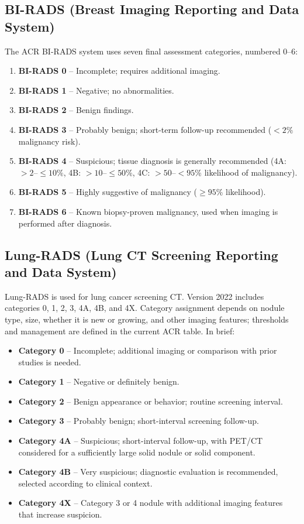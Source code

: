 \subsection{BI-RADS (Breast Imaging Reporting and Data System)}
The ACR BI-RADS system uses seven final assessment categories, numbered 0--6:
\begin{enumerate}
    \item \textbf{BI-RADS 0} -- Incomplete; requires additional imaging.
    \item \textbf{BI-RADS 1} -- Negative; no abnormalities.
    \item \textbf{BI-RADS 2} -- Benign findings.
    \item \textbf{BI-RADS 3} -- Probably benign; short-term follow-up recommended ($<2\%$ malignancy risk).
    \item \textbf{BI-RADS 4} -- Suspicious; tissue diagnosis is generally recommended (4A: $>2$--$\leq10\%$, 4B: $>10$--$\leq50\%$, 4C: $>50$--$<95\%$ likelihood of malignancy).
    \item \textbf{BI-RADS 5} -- Highly suggestive of malignancy ($\geq95\%$ likelihood).
    \item \textbf{BI-RADS 6} -- Known biopsy-proven malignancy, used when imaging is performed after diagnosis.
\end{enumerate}

\subsection{Lung-RADS (Lung CT Screening Reporting and Data System)}
Lung-RADS is used for lung cancer screening CT. Version 2022 includes categories 0, 1, 2, 3, 4A, 4B, and 4X. Category assignment depends on nodule type, size, whether it is new or growing, and other imaging features; thresholds and management are defined in the current ACR table. In brief:
\begin{itemize}
    \item \textbf{Category 0} -- Incomplete; additional imaging or comparison with prior studies is needed.
    \item \textbf{Category 1} -- Negative or definitely benign.
    \item \textbf{Category 2} -- Benign appearance or behavior; routine screening interval.
    \item \textbf{Category 3} -- Probably benign; short-interval screening follow-up.
    \item \textbf{Category 4A} -- Suspicious; short-interval follow-up, with PET/CT considered for a sufficiently large solid nodule or solid component.
    \item \textbf{Category 4B} -- Very suspicious; diagnostic evaluation is recommended, selected according to clinical context.
    \item \textbf{Category 4X} -- Category 3 or 4 nodule with additional imaging features that increase suspicion.
\end{itemize}

